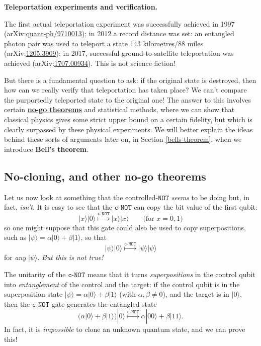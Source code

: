 \documentclass[fleqn,a4paper]{article}
\newenvironment{technical}[1]{\textbf{#1.}\par\vspace{.5\baselineskip}\everypar{\setlength{\parindent}{1.5em}}}{}
\theoremstyle{definition}
\theoremstyle{definition}
\theoremstyle{definition}
\theoremstyle{definition}
\theoremstyle{remark}
\begin{document}
\begin{technical}{Teleportation experiments and verification}
The first actual teleportation experiment was successfully achieved in 1997 (arXiv:\href{https://arxiv.org/abs/quant-ph/9710013}{quant-ph/9710013}); in 2012 a record distance was set: an entangled photon pair was used to teleport a state 143 kilometres/88 miles (arXiv:\href{https://arxiv.org/abs/1205.3909}{1205.3909}); in 2017, successful ground-to-satellite teleportation was achieved (arXiv:\href{https://arxiv.org/abs/1707.00934}{1707.00934}).
This is not science fiction!

But there is a fundamental question to ask: if the original state is destroyed, then how can we really verify that teleportation has taken place?
We can't compare the purportedly teleported state to the original one!
The answer to this involves certain \href{https://en.wikipedia.org/wiki/No-go_theorem}{\textbf{no-go theorems}} and statistical methods, where we can show that classical physics gives some strict upper bound on a certain fidelity, but which is clearly surpassed by these physical experiments.
We will better explain the ideas behind these sorts of arguments later on, in Section \ref{bells-theorem}, when we introduce \textbf{Bell's theorem}.

\end{technical}

\hypertarget{no-cloning-and-no-go}{%
\subsection{No-cloning, and other no-go theorems}\label{no-cloning-and-no-go}}

Let us now look at something that the controlled-\(\texttt{NOT}\) \emph{seems} to be doing but, in fact, \emph{isn't}.
It is easy to see that the \(\texttt{c-NOT}\) can copy the bit value of the first qubit:
\[
  |x\rangle|0\rangle \overset{\texttt{c-NOT}}{\longmapsto} |x\rangle|x\rangle
  \qquad\text{(for $x=0,1$)}
\]
so one might suppose that this gate could also be used to copy superpositions, such as \(|\psi\rangle = \alpha|0\rangle+\beta|1\rangle\), so that
\[
  |\psi\rangle|0\rangle \overset{\texttt{c-NOT}}{\longmapsto} |\psi\rangle|\psi\rangle
\]
for \emph{any} \(|\psi\rangle\).
\emph{But this is not true!}

The unitarity of the \(\texttt{c-NOT}\) means that it turns \emph{superpositions} in the control qubit into \emph{entanglement} of the control and the target: if the control qubit is in the superposition state \(|\psi\rangle = \alpha|0\rangle+\beta|1\rangle\) (with \(\alpha,\beta\neq0\)), and the target is in \(|0\rangle\), then the \(\texttt{c-NOT}\) gate generates the entangled state
\[
  \big( \alpha|0\rangle+\beta|1\rangle \big) |0\rangle
  \overset{\texttt{c-NOT}}{\longmapsto}
  \alpha|00\rangle + \beta|11\rangle.
\]
In fact, it is \emph{impossible} to clone an unknown quantum state, and we can prove this!
\end{document}
